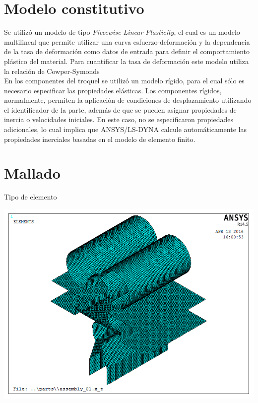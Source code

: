 \section{Modelo constitutivo}

Se utilizó un modelo de tipo \textit{Piecewise Linear Plasticity}, el cual es un modelo multilineal 
que permite utilizar una curva esfuerzo-deformación y la dependencia de la tasa de deformación 
como datos de entrada para definir el comportamiento plástico del material. Para cuantificar 
la tasa de deformación este modelo utiliza la relación de Cowper-Symonds \\

En los componentes del troquel se utilizó un modelo rígido, para el cual sólo es necesario 
especificar las propiedades elásticas. Los componentes rígidos, normalmente, permiten la 
aplicación de condiciones de desplazamiento utilizando el identificador de la parte, además 
de que se pueden asignar propiedades de inercia o velocidades iniciales. En este caso, no se 
especificaron propiedades adicionales, lo cual implica que ANSYS/LS-DYNA calcule automáticamente 
las propiedades inerciales basadas en el modelo de elemento finito.

\section{Mallado}

Tipo de elemento 

\begin{center}
\includegraphics[scale=0.6]{src/ch3/mesh_assembly_01.png}
\label{fig:mesh_assembly01}
\end{center}

